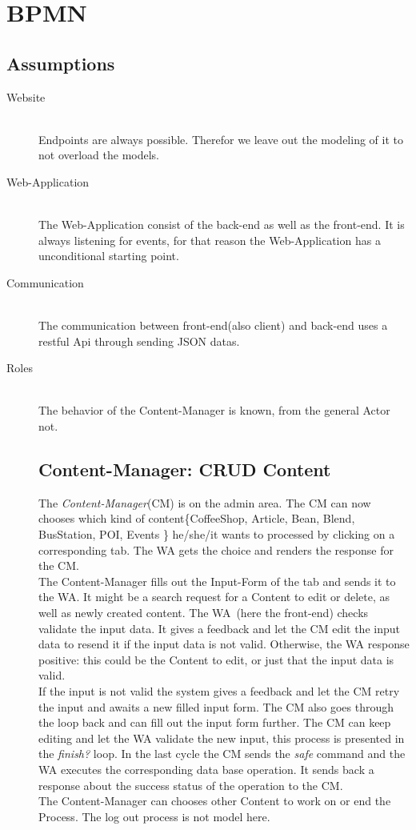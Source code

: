 \newpage
\section{BPMN}
\subsection{Assumptions}
\begin{description}
\item[Website]\hfill \\
Endpoints are always possible. Therefor we leave out the modeling of it to not overload the models.
\item[Web-Application]\hfill \\ 
The Web-Application consist of the back-end as well as the front-end.
It is always listening for events, for that reason the Web-Application has a unconditional starting point.
\item[Communication]\hfill \\ The communication between front-end(also client) and back-end uses a restful Api through sending JSON datas. 
\item[Roles]\hfill \\ 
The behavior of the Content-Manager is known, from the general Actor not.

\newpage
\subsection{Content-Manager: CRUD Content}
The \textit{Content-Manager}(CM) is on the admin area.
The CM can now chooses which kind of content\{CoffeeShop, Article, Bean, Blend, BusStation, POI, Events \} he/she/it wants to processed by clicking on a corresponding tab. The WA gets the choice and renders the response for the CM.\\
The Content-Manager fills out the Input-Form of the tab and sends it to the WA. It might be a search request for a Content to edit or delete, as well as newly created content. The WA~(here the front-end) checks validate the input data. It gives a feedback and let the CM edit the input data to resend it if the input data is not valid. Otherwise, the WA response positive: this could be the Content to edit, or just that the input data is valid.\\
If the input is not valid the system gives a feedback and let the CM retry the input and awaits a new filled input form. The CM also goes through the loop back and can fill out the input form further.  The CM can keep editing and let the WA validate the new input, this process is presented in the \textit{finish?} loop. In the last cycle the CM sends the \textit{safe} command and the WA executes the corresponding data base operation. It sends back a response about the success status of the operation to  the CM.\\
The Content-Manager can chooses other Content to work on or end the Process. The log out process is not model here.



\end{description}
